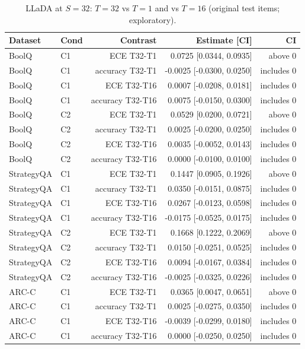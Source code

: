 \begin{table}[h!]
\centering
\scriptsize
\caption{LLaDA at $S{=}32$: $T{=}32$ vs $T{=}1$ and vs $T{=}16$ (original test items; exploratory).}
\label{tab:t32}
\begin{tabular}{llrrr}
\toprule
Dataset & Cond & Contrast & Estimate [CI] & CI \\
\midrule
BoolQ & C1 & ECE T32-T1 & 0.0725 [0.0344, 0.0935] & above 0 \\
BoolQ & C1 & accuracy T32-T1 & -0.0025 [-0.0300, 0.0250] & includes 0 \\
BoolQ & C1 & ECE T32-T16 & 0.0007 [-0.0208, 0.0181] & includes 0 \\
BoolQ & C1 & accuracy T32-T16 & 0.0075 [-0.0150, 0.0300] & includes 0 \\
BoolQ & C2 & ECE T32-T1 & 0.0529 [0.0200, 0.0721] & above 0 \\
BoolQ & C2 & accuracy T32-T1 & 0.0025 [-0.0200, 0.0250] & includes 0 \\
BoolQ & C2 & ECE T32-T16 & 0.0035 [-0.0052, 0.0143] & includes 0 \\
BoolQ & C2 & accuracy T32-T16 & 0.0000 [-0.0100, 0.0100] & includes 0 \\
StrategyQA & C1 & ECE T32-T1 & 0.1447 [0.0905, 0.1926] & above 0 \\
StrategyQA & C1 & accuracy T32-T1 & 0.0350 [-0.0151, 0.0875] & includes 0 \\
StrategyQA & C1 & ECE T32-T16 & 0.0267 [-0.0123, 0.0598] & includes 0 \\
StrategyQA & C1 & accuracy T32-T16 & -0.0175 [-0.0525, 0.0175] & includes 0 \\
StrategyQA & C2 & ECE T32-T1 & 0.1668 [0.1222, 0.2069] & above 0 \\
StrategyQA & C2 & accuracy T32-T1 & 0.0150 [-0.0251, 0.0525] & includes 0 \\
StrategyQA & C2 & ECE T32-T16 & 0.0094 [-0.0167, 0.0384] & includes 0 \\
StrategyQA & C2 & accuracy T32-T16 & -0.0025 [-0.0325, 0.0226] & includes 0 \\
ARC-C & C1 & ECE T32-T1 & 0.0365 [0.0047, 0.0651] & above 0 \\
ARC-C & C1 & accuracy T32-T1 & 0.0025 [-0.0275, 0.0350] & includes 0 \\
ARC-C & C1 & ECE T32-T16 & -0.0039 [-0.0299, 0.0180] & includes 0 \\
ARC-C & C1 & accuracy T32-T16 & 0.0000 [-0.0250, 0.0250] & includes 0 \\

\end{tabular}
\end{table}

